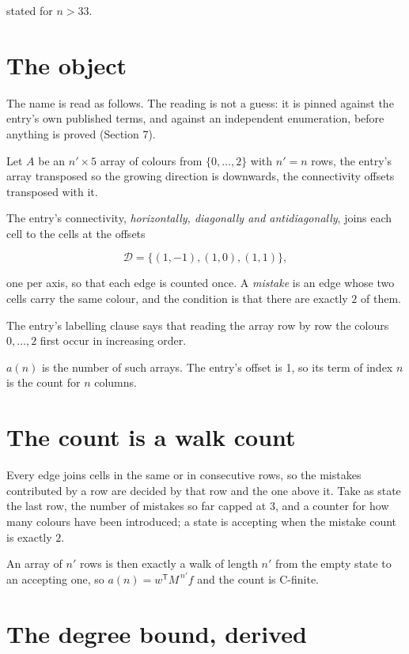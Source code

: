 \documentclass[11pt]{article}
\theoremstyle{definition}
\begin{document}
stated for $n > 33$.

\section{The object}

The name is read as follows. The reading is not a guess: it is pinned against the entry's own published terms, and against an independent enumeration, before anything is proved (Section 7).

Let $A$ be an $n' \times 5$ array of colours from $\{0,\dots,2\}$ with $n' = n$ rows, the entry's array transposed so the growing direction is downwards, the connectivity offsets transposed with it.

The entry's connectivity, {\itshape horizontally, diagonally and antidiagonally}, joins each cell to the cells at the offsets

\[\mathcal{D} = \{(1,-1), (1,0), (1,1)\},\]

one per axis, so that each edge is counted once. A {\itshape mistake} is an edge whose two cells carry the same colour, and the condition is that there are exactly $2$ of them.

The entry's labelling clause says that reading the array row by row the colours $0,\dots,2$ first occur in increasing order.

$a(n)$ is the number of such arrays. The entry's offset is 1, so its term of index $n$ is the count for $n$ columns.

\section{The count is a walk count}

Every edge joins cells in the same or in consecutive rows, so the mistakes contributed by a row are decided by that row and the one above it. Take as state the last row, the number of mistakes so far capped at $3$, and a counter for how many colours have been introduced; a state is accepting when the mistake count is exactly $2$.

An array of $n'$ rows is then exactly a walk of length $n'$ from the empty state to an accepting one, so $a(n) = w^{\mathsf T}M^{\,n'}f$ and the count is C-finite.

\section{The degree bound, derived}
\end{document}
